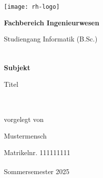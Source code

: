 \begin{titlepage}
 
    \texttt{[image: rh-logo]}\\[1.95cm]
    
    \vspace{2cm}
    \begin{minipage}{\textwidth}
    \hspace{3cm}\begin{minipage}{\dimexpr\textwidth-3cm\relax}
    {\Large\textbf{Fachbereich Ingenieurwesen}}
    
    {\Large Studiengang Informatik (B.Sc.)}\\
    \\
    \\
    
    
    {\Large\textbf{Subjekt}}
    
    \parbox{\textwidth}{\Large\raggedright Titel}\\
    \\
    
    {\normalsize\fontsize{11pt}{16.5pt}\selectfont vorgelegt von}
    
    {\Large Mustermensch}
    
    {\normalsize\fontsize{11pt}{16.5pt}\selectfont Matrikelnr. 111111111}\\
    \\
    
    {\normalsize Sommersemester 2025}
    \end{minipage}
    \end{minipage}
    
    \vfill
    
\end{titlepage}
